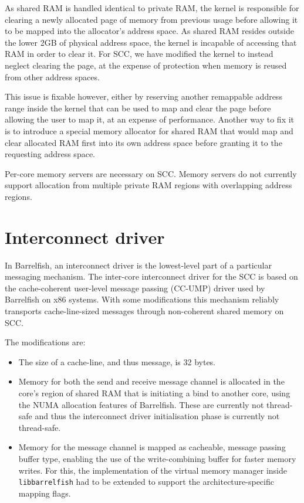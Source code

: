 \documentclass[a4paper,twoside]{report} %
\begin{document}
As shared RAM is handled identical to private RAM, the kernel is
responsible for clearing a newly allocated page of memory from
previous usage before allowing it to be mapped into the allocator's
address space. As shared RAM resides outside the lower 2GB of physical
address space, the kernel is incapable of accessing that RAM in order
to clear it. For SCC, we have modified the kernel to instead neglect
clearing the page, at the expense of protection when memory is reused
from other address spaces.

This issue is fixable however, either by reserving another remappable
address range inside the kernel that can be used to map and clear the
page before allowing the user to map it, at an expense of
performance. Another way to fix it is to introduce a special memory
allocator for shared RAM that would map and clear allocated RAM first
into its own address space before granting it to the requesting
address space.

Per-core memory servers are necessary on SCC. Memory servers do not
currently support allocation from multiple private RAM regions with
overlapping address regions.

\section{Interconnect driver}\label{sec:interconnect}

In Barrelfish, an interconnect driver is the lowest-level part of a
particular messaging mechanism. The inter-core interconnect driver for
the SCC is based on the cache-coherent user-level message passing
(CC-UMP) driver used by Barrelfish on x86 systems. With some
modifications this mechanism reliably transports cache-line-sized
messages through non-coherent shared memory on SCC.

The modifications are:
\begin{itemize}
\item The size of a cache-line, and thus message, is 32 bytes.

\item Memory for both the send and receive message channel is
  allocated in the core's region of shared RAM that is initiating a
  bind to another core, using the NUMA allocation features of
  Barrelfish. These are currently not thread-safe and thus the
  interconnect driver initialisation phase is currently not
  thread-safe.

\item Memory for the message channel is mapped as cacheable, message
  passing buffer type, enabling the use of the write-combining buffer
  for faster memory writes. For this, the implementation of the
  virtual memory manager inside \texttt{libbarrelfish} had to be
  extended to support the architecture-specific mapping flags.
\end{itemize}
\end{document}
